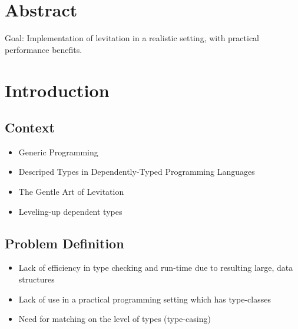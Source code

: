 \documentclass{ituthesis}
\begin{document}

\frontmatter

\thetitlepage
\newpage

\chapter*{Abstract}
Goal: Implementation of levitation in a realistic setting, with practical performance benefits.

\cleardoublepage
\setcounter{tocdepth}{1}
\tableofcontents

\mainmatter

\midsloppy
\sloppybottom

\chapter{Introduction}
\label{cha:Intoduction}
\section{Context}
\label{sec:Context}
\begin{itemize}
  \item Generic Programming
  \item Descriped Types in Dependently-Typed Programming Languages
  \item The Gentle Art of Levitation
  \item Leveling-up dependent types
\end{itemize}
\section{Problem Definition}
\label{sec:ProblemDefinition}
\begin{itemize}
  \item Lack of efficiency in type checking and run-time due to resulting large, data structures
  \item Lack of use in a practical programming setting which has type-classes
  \item Need for matching on the level of types (type-casing)
\end{itemize}
\end{document}
